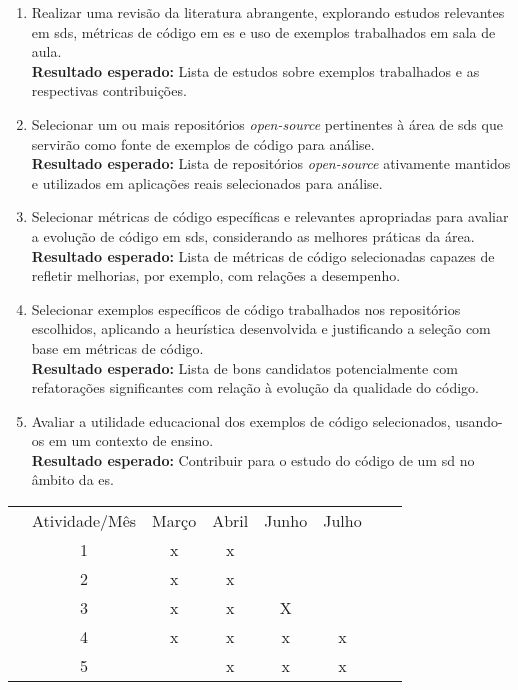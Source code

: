 \begin{itemize}
\begin{enumerate}
    \item Realizar uma revisão da literatura abrangente, explorando estudos relevantes em \gls{sds}, métricas de código em \gls{es} e uso de exemplos trabalhados em sala de aula.
    \\\textbf{Resultado esperado:} Lista de estudos sobre exemplos trabalhados e as respectivas contribuições.

    \item Selecionar um ou mais repositórios \textit{open-source} pertinentes à área de \gls{sds} que servirão como fonte de exemplos de código para análise.
    \\\textbf{Resultado esperado:} Lista de repositórios \textit{open-source} ativamente mantidos e utilizados em aplicações reais selecionados para análise.

    \item Selecionar métricas de código específicas e relevantes apropriadas para avaliar a evolução de código em \gls{sds}, considerando as melhores práticas da área.
    \\\textbf{Resultado esperado:} Lista de métricas de código selecionadas capazes de refletir melhorias, por exemplo, com relações a desempenho.

    \item Selecionar exemplos específicos de código trabalhados nos repositórios escolhidos, aplicando a heurística desenvolvida e justificando a seleção com base em métricas de código.
    \\\textbf{Resultado esperado:} Lista de bons candidatos potencialmente com refatorações significantes com relação à evolução da qualidade do código.

    \item Avaliar a utilidade educacional dos exemplos de código selecionados, usando-os em um contexto de ensino.
    \\\textbf{Resultado esperado:} Contribuir para o estudo do código de um \gls{sd} no âmbito da \gls{es}.
\end{enumerate}
\end{itemize}

\begin{table}[]
\begin{tabular}{cccccccc}

\cline{1-1}
\multicolumn{1}{|l|}{} & Atividade/Mês & Março & Abril & Junho & Julho  \\ \cline{1-1}
                       & 1 & x & x &  & \\
                       & 2 & x & x &  & \\
                       & 3 & x & x & X & \\
                       & 4 & x & x & x & x \\
                       & 5 &  & x & x & x
\end{tabular}
\end{table}